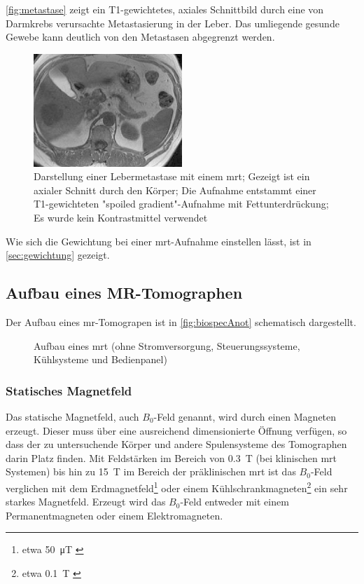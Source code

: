 \autoref{fig:metastase} zeigt ein T1-gewichtetes, axiales Schnittbild durch eine von Darmkrebs verursachte Metastasierung in der Leber. Das umliegende gesunde Gewebe kann deutlich von den Metastasen abgegrenzt werden.

\begin{figure}[H]
	\centering
	\includegraphics[width=0.5\textwidth]{img/ext/metastase.png}
	\caption[Lebermetastase]{Darstellung einer Lebermetastase mit einem \gls{mrt}; Gezeigt ist ein axialer Schnitt durch den Körper; Die Aufnahme entstammt einer T1-gewichteten "spoiled gradient"-Aufnahme mit Fettunterdrückung; Es wurde kein Kontrastmittel verwendet \cite[S.~872]{Reiser2008}}
	\label{fig:metastase}
\end{figure}

Wie sich die Gewichtung bei einer \gls{mrt}-Aufnahme einstellen lässt, ist in \autoref{sec:gewichtung} gezeigt.

\subsection{Aufbau eines MR-Tomographen}
Der Aufbau eines \gls{mr}-Tomograpen ist in \autoref{fig:biospecAnot} schematisch dargestellt.

\begin{figure}[H]
	\centering
	\caption[Aufbau MR-Tomographen]{Aufbau eines \gls{mrt} (ohne Stromversorgung, Steuerungssysteme, Kühlsysteme und Bedienpanel)}
	\label{fig:biospecAnot}
\end{figure}

\subsubsection{Statisches Magnetfeld}
Das statische Magnetfeld, auch $B_0$-Feld genannt, wird durch einen Magneten erzeugt. Dieser muss über eine ausreichend dimensionierte Öffnung verfügen, so dass der zu untersuchende Körper und andere Spulensysteme des Tomographen darin Platz finden. Mit Feldstärken im Bereich von \SI{0.3}{\tesla} (bei klinischen \gls{mrt} Systemen) bis hin zu \SI{15}{\tesla} im Bereich der präklinischen \gls{mrt} ist das $B_0$-Feld verglichen mit dem Erdmagnetfeld\footnote{etwa \SI{50}{\micro\tesla} \cite{Enc1994}} oder einem Kühlschrankmagneten\footnote{etwa \SI{0.1}{\tesla} \cite{LHC2018}} ein sehr starkes Magnetfeld.
Erzeugt wird das $B_0$-Feld entweder mit einem Permanentmagneten oder einem Elektromagneten. 

